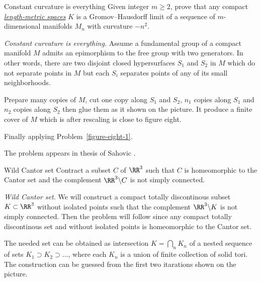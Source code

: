 \begin{pr}{\thm}{Constant curvature is everything}\label{figure-eight-2} Given integer $m\ge 2$, prove that any compact \hyperref[Length-metric space]{\emph{length-metric spaces}} $K$ is a Gromov--Hausdorff limit of a sequence of $m$-dimensional
manifolds $M_n$ with curvature $-n^2$.
\end{pr}

\textit{Constant curvature is everything.}
Assume a fundamental group of a compact manifold $M$ admits an epimorphism to the free group with two generators.
In other words, there are two disjoint closed hypersurfaces $S_1$ and $S_2$ in $M$ 
which do not separate points in $M$
but each $S_i$ separates points of any of its small neighborhoods.

Prepare many copies of $M$, cut one copy along $S_1$ and $S_2$,
$n_1$ copies along $S_1$ and $n_2$ copies along $S_2$
then glue them as it shown on the picture. 
It produce a finite cover of $M$ which is after rescaling is close to figure eight.

Finally applying Problem~\ref{figure-eight-1}.

 The problem appears in thesis of Sahovic \cite{sahovic}.



















\begin{pr}{}{Wild Cantor set}\label{Wild Cantor set} 
Contract a subset $C$ of $\RR^3$ 
such that $C$ is homeomorphic to the Cantor set and the complement $\RR^3\backslash C$ is not simply connected.
\end{pr}



\textit{Wild Cantor set.}
We will construct a compact totally discontinous subset $K\subset\RR^3$ without isolated points  
such that the complement $\RR^3\backslash K$ is not simply connected.
Then the problem will follow
since any compact totally discontinous set and without isolated points
is homeomorphic to the Cantor set.

The needed set can be obtained as intersection $K=\bigcap_n K_n$
of a nested sequence 
of sets $K_1\supset K_2\supset\dots$, where each $K_n$ is a union of finite collection of solid tori. 
The construction can be guessed from the first two itarations shown on the picture.

